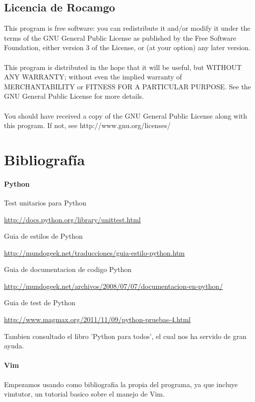 \documentclass[12pt,a4paper]{report}
\begin{document}
\section{Licencia de Rocamgo}

This program is free software: you can redistribute it and/or modify it under
the terms of the GNU General Public License as published by the Free Software
Foundation, either version 3 of the License, or (at your option) any later
version. \\ \\ This program is distributed in the hope that it will be useful,
but WITHOUT ANY WARRANTY; without even the implied warranty of MERCHANTABILITY
or FITNESS FOR A PARTICULAR PURPOSE.  See the GNU General Public License for
more details. \\ \\ You should have received a copy of the GNU General Public
License along with this program.  If not, see http://www.gnu.org/licenses/



\chapter{Bibliografía}


\subsubsection{Python }
Test unitarios para Python

\url{http://docs.python.org/library/unittest.html}

Guia de estilos de Python

\url{http://mundogeek.net/traducciones/guia-estilo-python.htm}

Guia de documentacion de codigo Python

\url{http://mundogeek.net/archivos/2008/07/07/documentacion-en-python/}

Guia de test de Python

\url{http://www.magmax.org/2011/11/09/python-pruebas-4.html}

Tambien consultado el libro 'Python para todos', el cual nos ha servido de gran
ayuda.

\subsubsection{Vim}

Empezamos usando como bibliografia la propia del programa, ya que incluye
vimtutor, un tutorial basico sobre el manejo de Vim.
\end{document}
